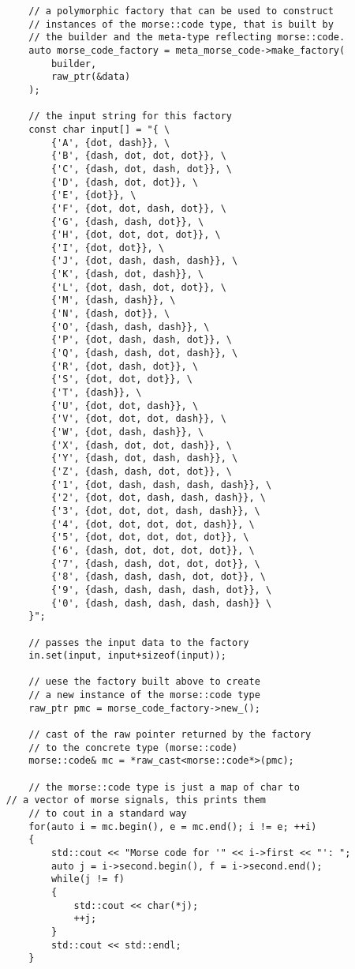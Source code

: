 \begin{lstlisting}
        // a polymorphic factory that can be used to construct
        // instances of the morse::code type, that is built by
        // the builder and the meta-type reflecting morse::code.
        auto morse_code_factory = meta_morse_code->make_factory(
            builder,
            raw_ptr(&data)
        );

        // the input string for this factory
        const char input[] = "{ \
            {'A', {dot, dash}}, \
            {'B', {dash, dot, dot, dot}}, \
            {'C', {dash, dot, dash, dot}}, \
            {'D', {dash, dot, dot}}, \
            {'E', {dot}}, \
            {'F', {dot, dot, dash, dot}}, \
            {'G', {dash, dash, dot}}, \
            {'H', {dot, dot, dot, dot}}, \
            {'I', {dot, dot}}, \
            {'J', {dot, dash, dash, dash}}, \
            {'K', {dash, dot, dash}}, \
            {'L', {dot, dash, dot, dot}}, \
            {'M', {dash, dash}}, \
            {'N', {dash, dot}}, \
            {'O', {dash, dash, dash}}, \
            {'P', {dot, dash, dash, dot}}, \
            {'Q', {dash, dash, dot, dash}}, \
            {'R', {dot, dash, dot}}, \
            {'S', {dot, dot, dot}}, \
            {'T', {dash}}, \
            {'U', {dot, dot, dash}}, \
            {'V', {dot, dot, dot, dash}}, \
            {'W', {dot, dash, dash}}, \
            {'X', {dash, dot, dot, dash}}, \
            {'Y', {dash, dot, dash, dash}}, \
            {'Z', {dash, dash, dot, dot}}, \
            {'1', {dot, dash, dash, dash, dash}}, \
            {'2', {dot, dot, dash, dash, dash}}, \
            {'3', {dot, dot, dot, dash, dash}}, \
            {'4', {dot, dot, dot, dot, dash}}, \
            {'5', {dot, dot, dot, dot, dot}}, \
            {'6', {dash, dot, dot, dot, dot}}, \
            {'7', {dash, dash, dot, dot, dot}}, \
            {'8', {dash, dash, dash, dot, dot}}, \
            {'9', {dash, dash, dash, dash, dot}}, \
            {'0', {dash, dash, dash, dash, dash}} \
        }";

        // passes the input data to the factory
        in.set(input, input+sizeof(input));

        // uese the factory built above to create
        // a new instance of the morse::code type
        raw_ptr pmc = morse_code_factory->new_();

        // cast of the raw pointer returned by the factory
        // to the concrete type (morse::code)
        morse::code& mc = *raw_cast<morse::code*>(pmc);

        // the morse::code type is just a map of char to
	// a vector of morse signals, this prints them
        // to cout in a standard way
        for(auto i = mc.begin(), e = mc.end(); i != e; ++i)
        {
            std::cout << "Morse code for '" << i->first << "': ";
            auto j = i->second.begin(), f = i->second.end();
            while(j != f)
            {
                std::cout << char(*j);
                ++j;
            }
            std::cout << std::endl;
        }


\end{lstlisting}
